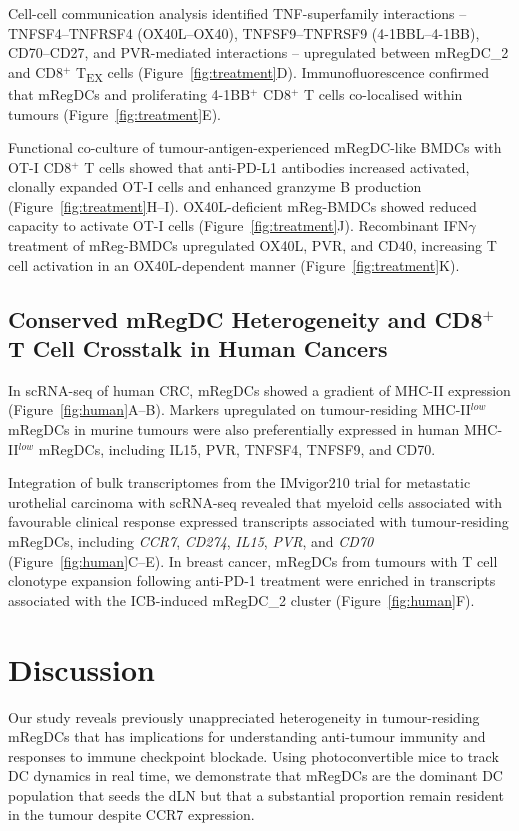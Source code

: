 \documentclass[11pt]{article}
\begin{document}
Cell-cell communication analysis identified TNF-superfamily interactions -- TNFSF4--TNFRSF4 (OX40L--OX40), TNFSF9--TNFRSF9 (4-1BBL--4-1BB), CD70--CD27, and PVR-mediated interactions -- upregulated between mRegDC\_2 and CD8$^+$ T\textsubscript{EX} cells (Figure~\ref{fig:treatment}D). Immunofluorescence confirmed that mRegDCs and proliferating 4-1BB$^+$ CD8$^+$ T cells co-localised within tumours (Figure~\ref{fig:treatment}E).

Functional co-culture of tumour-antigen-experienced mRegDC-like BMDCs with OT-I CD8$^+$ T cells showed that anti-PD-L1 antibodies increased activated, clonally expanded OT-I cells and enhanced granzyme B production (Figure~\ref{fig:treatment}H--I). OX40L-deficient mReg-BMDCs showed reduced capacity to activate OT-I cells (Figure~\ref{fig:treatment}J). Recombinant IFN$\gamma$ treatment of mReg-BMDCs upregulated OX40L, PVR, and CD40, increasing T cell activation in an OX40L-dependent manner (Figure~\ref{fig:treatment}K).

\subsection{Conserved mRegDC Heterogeneity and CD8$^+$ T Cell Crosstalk in Human Cancers}

In scRNA-seq of human CRC, mRegDCs showed a gradient of MHC-II expression (Figure~\ref{fig:human}A--B). Markers upregulated on tumour-residing MHC-II$^{low}$ mRegDCs in murine tumours were also preferentially expressed in human MHC-II$^{low}$ mRegDCs, including IL15, PVR, TNFSF4, TNFSF9, and CD70.

Integration of bulk transcriptomes from the IMvigor210 trial for metastatic urothelial carcinoma with scRNA-seq revealed that myeloid cells associated with favourable clinical response expressed transcripts associated with tumour-residing mRegDCs, including \textit{CCR7}, \textit{CD274}, \textit{IL15}, \textit{PVR}, and \textit{CD70} (Figure~\ref{fig:human}C--E). In breast cancer, mRegDCs from tumours with T cell clonotype expansion following anti-PD-1 treatment were enriched in transcripts associated with the ICB-induced mRegDC\_2 cluster (Figure~\ref{fig:human}F).

\section{Discussion}

Our study reveals previously unappreciated heterogeneity in tumour-residing mRegDCs that has implications for understanding anti-tumour immunity and responses to immune checkpoint blockade. Using photoconvertible mice to track DC dynamics in real time, we demonstrate that mRegDCs are the dominant DC population that seeds the dLN but that a substantial proportion remain resident in the tumour despite CCR7 expression.
\end{document}
